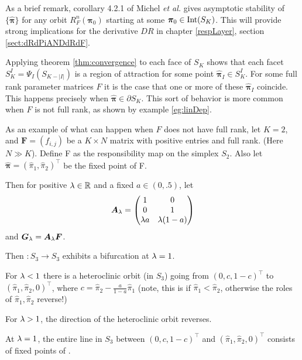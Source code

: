 As a brief remark, corollary 4.2.1 of Michel \textit{et al.} \cite{michel2015stability} gives asymptotic stability of \( \{\hat{\bm \pi}\} \) for any orbit \( R_F^n(\bm\pi_0) \) starting at some \( \bm\pi_0\in\operatorname{Int}(S_K) \). This will provide strong implications for the derivative \( DR \) in chapter \ref{respLayer}, section \ref{sect:dRdPiANDdRdF}.

Applying theorem \ref{thm:convergence} to each face of \( S_K \) shows that each facet \( S_K^I = \Psi_I(S_{K-|I|}) \) is a region of attraction for some point \( \hat{\bm \pi}_I \in S_K^I\).  For some full rank parameter matrices \( F \) it is the case that one or more of these \( \hat{\bm \pi}_I \) coincide.  This happens precisely when \( \hat{\bm\pi}\in \partial S_K \). This sort of behavior is more common when \( F \) is not full rank, as shown by example \ref{eg:linDep}.

\begin{eg}\label{eg:linDep}
	As an example of what can happen when $F$ does not have full rank, let \(K=2\), and \(\bm{F}=(f_{i,j})\) be a \(K\times N\) matrix with positive entries and full rank. (Here \(N \gg K\)).  Define \Rpi F as the responsibility map on  the simplex \( S_2 \). Also let \(\hat{\bm{\pi}}=(\hat{\pi}_1,\hat{\pi}_2)^\intercal\) be the fixed point of \Rpi F.
	
	Then for positive $\lambda\in\mathbb R$ and a fixed $a\in(0,.5)$, let 	
	\[\bm A_{\lambda}=\begin{pmatrix}
	1 & 0\\
	0 & 1\\
	\lambda a & \lambda(1-a)\\
	\end{pmatrix}\]
	and $\bm G_{\lambda}=\bm A_{\lambda}\bm F$.
	
	Then \( :S_3\rightarrow S_3 \) exhibits a bifurcation at $\lambda=1$.
	
	For $\lambda<1$ there is a heteroclinic orbit (in $S_3$) going from $(0,c,1-c)^{\intercal}$ to $(\hat{\pi}_1,\hat{\pi}_2,0)^\intercal$, where $c=\hat{\pi}_2-\frac{a}{1-a}\hat{\pi}_1$ (note, this is if $\hat{\pi}_1<\hat{\pi}_2$, otherwise the roles of $\hat{\pi}_1,\hat{\pi}_2$ reverse!)
	
	For $\lambda>1$, the direction of the heteroclinic orbit reverses.
	
	At $\lambda=1$, the entire line in $S_3$ between $(0,c,1-c)^{\intercal}$ and $(\hat{\pi}_1,\hat{\pi}_2,0)^\intercal$ consists of fixed points of .
	
\end{eg}

